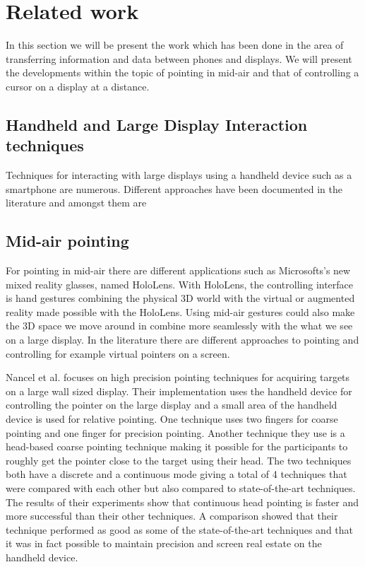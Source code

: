 \section{Related work} \label{sec:relatedwork}
In this section we will be present the work which has been done in the area of transferring information and data between phones and displays.
We will present the developments within the topic of pointing in mid-air and that of controlling a cursor on a display at a distance.

\subsection{Handheld and Large Display Interaction techniques} \label{sec:techniquesForTransfer}
Techniques for interacting with large displays using a handheld device such as a smartphone are numerous.
Different approaches have been documented in the literature and amongst them are 

\subsection{Mid-air pointing} \label{sec:midAirPointing}
For pointing in mid-air there are different applications such as Microsofts's new mixed reality glasses, named HoloLens.
With HoloLens, the controlling interface is hand gestures combining the physical 3D world with the virtual or augmented reality made possible with the HoloLens.
Using mid-air gestures could also make the 3D space we move around in combine more seamlessly with the what we see on a large display.
In the literature there are different approaches to pointing and controlling for example virtual pointers on a screen. 

Nancel et al. \cite{Nancel:2013} focuses on high precision pointing techniques for acquiring targets on a large wall sized display.
Their implementation uses the handheld device for controlling the pointer on the large display and a small area of the handheld device is used for relative pointing.
One technique uses two fingers for coarse pointing and one finger for precision pointing. 
Another technique they use is a head-based coarse pointing technique making it possible for the participants to roughly get the pointer close to the target using their head.
The two techniques both have a discrete and a continuous mode giving a total of 4 techniques that  were compared with each other but also compared to state-of-the-art techniques.
The results of their experiments show that continuous head pointing is faster and more successful than their other techniques.
A comparison showed that their technique performed as good as some of the state-of-the-art techniques and that it was in fact possible to maintain precision and screen real estate on the handheld device.